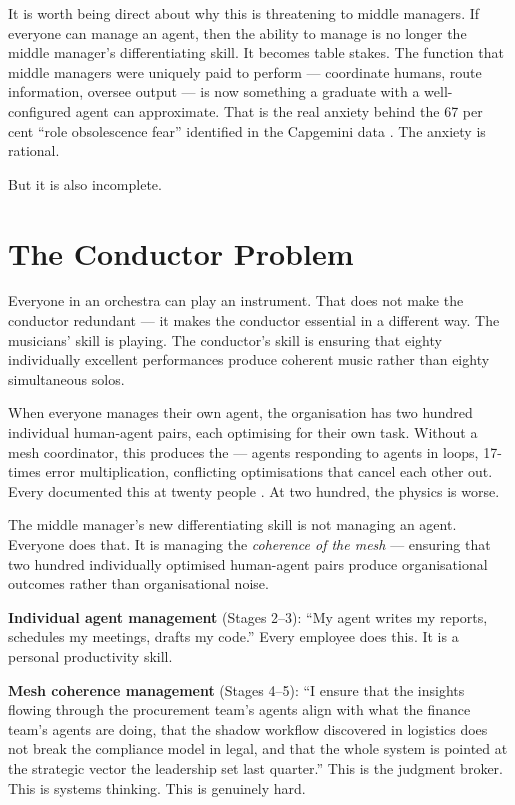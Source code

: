 It is worth being direct about why this is threatening to middle managers. If everyone can manage an agent, then the ability to manage is no longer the middle manager's differentiating skill. It becomes table stakes. The function that middle managers were uniquely paid to perform --- coordinate humans, route information, oversee output --- is now something a graduate with a well-configured agent can approximate. That is the real anxiety behind the 67 per cent ``role obsolescence fear'' identified in the Capgemini data \parencite{Capgemini2025}. The anxiety is rational.

But it is also incomplete.

\section{The Conductor Problem}

Everyone in an orchestra can play an instrument. That does not make the conductor redundant --- it makes the conductor essential in a different way. The musicians' skill is playing. The conductor's skill is ensuring that eighty individually excellent performances produce coherent music rather than eighty simultaneous solos.

When everyone manages their own agent, the organisation has two hundred individual human-agent pairs, each optimising for their own task. Without a mesh coordinator, this produces the  --- agents responding to agents in loops, 17-times error multiplication, conflicting optimisations that cancel each other out. Every documented this at twenty people \parencite{Shipper2026}. At two hundred, the physics is worse.

The middle manager's new differentiating skill is not managing an agent. Everyone does that. It is managing the \emph{coherence of the mesh} --- ensuring that two hundred individually optimised human-agent pairs produce organisational outcomes rather than organisational noise.

\begin{definitionbox}[title={Two Levels of Agent Management}]
\textbf{Individual agent management} (Stages 2--3): ``My agent writes my reports, schedules my meetings, drafts my code.'' Every employee does this. It is a personal productivity skill.

\textbf{Mesh coherence management} (Stages 4--5): ``I ensure that the insights flowing through the procurement team's agents align with what the finance team's agents are doing, that the shadow workflow discovered in logistics does not break the compliance model in legal, and that the whole system is pointed at the strategic vector the leadership set last quarter.'' This is the judgment broker. This is systems thinking. This is genuinely hard.
\end{definitionbox}

